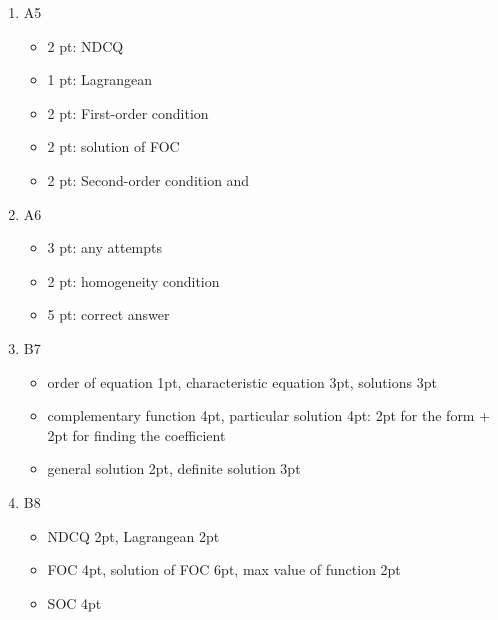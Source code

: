 \begin{enumerate}
\item A5
\begin{itemize}
\item 2 pt: NDCQ
\item 1 pt: Lagrangean
\item 2 pt: First-order condition
\item 2 pt: solution of FOC
\item 2 pt: Second-order condition and
\end{itemize}

\item A6
\begin{itemize}
\item 3 pt: any attempts
\item 2 pt: homogeneity condition
\item 5 pt: correct answer
\end{itemize}


\item B7
\begin{itemize}
\item order of equation 1pt, characteristic equation 3pt, solutions 3pt
\item complementary function 4pt, particular solution 4pt: 2pt for the form + 2pt for finding the coefficient
\item general solution 2pt, definite solution 3pt
\end{itemize}

\item B8
\begin{itemize}
\item NDCQ 2pt, Lagrangean 2pt
\item FOC 4pt, solution of FOC 6pt, max value of function 2pt
\item SOC 4pt
\end{itemize}


\end{enumerate}
